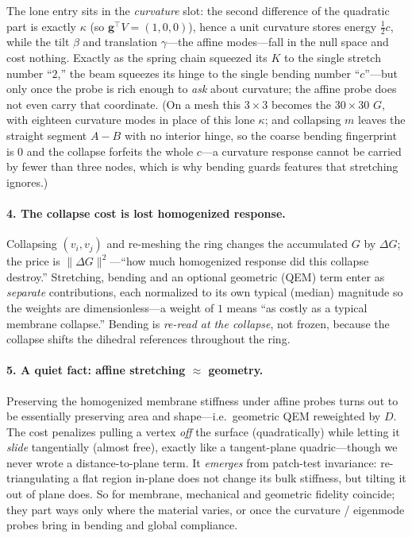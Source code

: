 The lone entry sits in the \emph{curvature} slot: the second difference of the quadratic part is exactly $\kappa$ (so $\mathbf{g}^\top V=(1,0,0)$), hence a unit curvature stores energy $\tfrac12 c$, while the tilt $\beta$ and translation $\gamma$---the affine modes---fall in the null space and cost nothing.
Exactly as the spring chain squeezed its $K$ to the single stretch number ``$2$,'' the beam squeezes its hinge to the single bending number ``$c$''---but only once the probe is rich enough to \emph{ask} about curvature; the affine probe does not even carry that coordinate.
(On a mesh this $3\times3$ becomes the $30\times30$ $G$, with eighteen curvature modes in place of this lone $\kappa$; and collapsing $m$ leaves the straight segment $A\!-\!B$ with no interior hinge, so the coarse bending fingerprint is $0$ and the collapse forfeits the whole $c$---a curvature response cannot be carried by fewer than three nodes, which is why bending guards features that stretching ignores.)

\paragraph{4. The collapse cost is lost homogenized response.}
Collapsing $(v_i,v_j)$ and re-meshing the ring changes the accumulated $G$ by $\Delta G$; the price is $\|\Delta G\|^2$---``how much homogenized response did this collapse destroy.''
Stretching, bending and an optional geometric (QEM) term enter as \emph{separate} contributions, each normalized to its own typical (median) magnitude so the weights are dimensionless---a weight of $1$ means ``as costly as a typical membrane collapse.''
Bending is \emph{re-read at the collapse}, not frozen, because the collapse shifts the dihedral references throughout the ring.

\paragraph{5. A quiet fact: affine stretching $\approx$ geometry.}
Preserving the homogenized membrane stiffness under affine probes turns out to be essentially preserving area and shape---i.e.\ geometric QEM reweighted by $D$.
The cost penalizes pulling a vertex \emph{off} the surface (quadratically) while letting it \emph{slide} tangentially (almost free), exactly like a tangent-plane quadric---though we never wrote a distance-to-plane term.
It \emph{emerges} from patch-test invariance: re-triangulating a flat region in-plane does not change its bulk stiffness, but tilting it out of plane does.
So for membrane, mechanical and geometric fidelity coincide; they part ways only where the material varies, or once the curvature / eigenmode probes bring in bending and global compliance.

